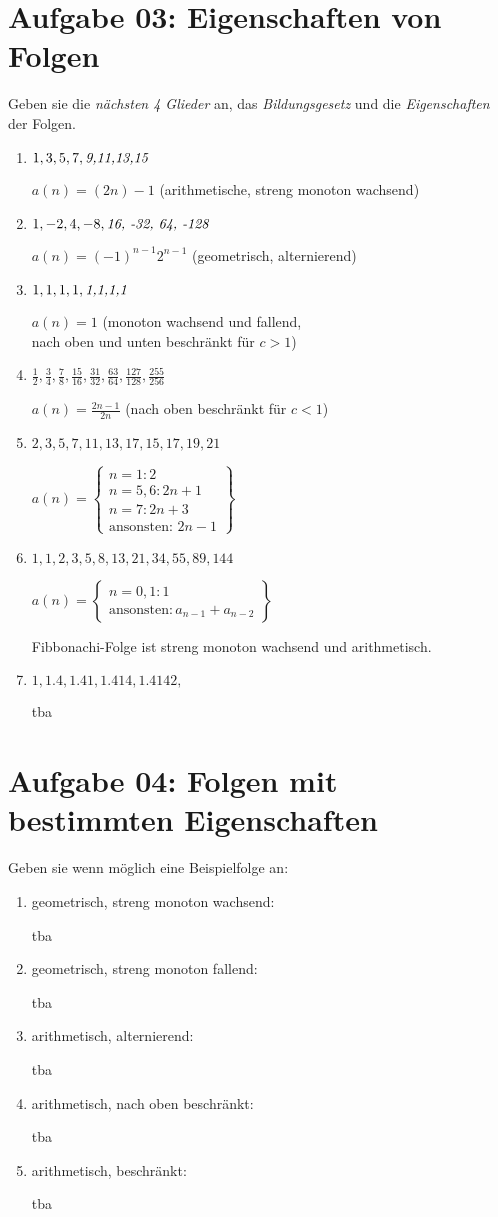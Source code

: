 \documentclass[a4paper,11pt]{article}
\begin{document}
\section{Aufgabe 03: Eigenschaften von Folgen}
Geben sie die \emph{nächsten 4 Glieder} an, das \emph{Bildungsgesetz} und die \emph{Eigenschaften} der Folgen.
\begin{enumerate}[label={\alph*)}]
	\item $1,3,5,7,\emph{9,11,13,15}$

		$a(n)=(2n)-1$ (arithmetische, streng monoton wachsend)
	\item $1,-2,4,-8,\emph{16, -32, 64, -128}$

		$a(n)=(-1)^{n-1}2^{n-1}$ (geometrisch, alternierend)
	\item $1,1,1,1,\emph{1,1,1,1}$

		$a(n)=1$ (monoton wachsend und fallend,\\
		nach oben und unten beschränkt für $c>1$)
	\item $\frac{1}{2},\frac{3}{4},\frac{7}{8},\frac{15}{16},\frac{31}{32},\frac{63}{64},\frac{127}{128},\frac{255}{256}$

		$a(n)=\frac{2n-1}{2n}$ (nach oben beschränkt für $c<1$)
	\item $2,3,5,7,11,13,17,15,17,19,21$

		$a(n)=\begin{Bmatrix}n=1:2\\
			n=5,6: 2n+1\\
			n=7: 2n+3\\
			\text{ansonsten: } 2n-1
		      \end{Bmatrix}$
	\item $1,1,2,3,5,8,13,21,34,55,89,144$

		$a(n)=\begin{Bmatrix}n=0,1: 1\\
			\text{ansonsten}: a_{n-1}+a_{n-2}
		\end{Bmatrix}$

		Fibbonachi-Folge ist streng monoton wachsend und arithmetisch.
	\item $1,1.4,1.41,1.414,1.4142,$

		tba
\end{enumerate}
\section{Aufgabe 04: Folgen mit bestimmten Eigenschaften}
Geben sie wenn möglich eine Beispielfolge an:
\begin{enumerate}[label={\alph*)}]
	\item geometrisch, streng monoton wachsend:

		tba
	\item geometrisch, streng monoton fallend:

		tba
	\item arithmetisch, alternierend:

		tba
	\item arithmetisch, nach oben beschränkt:

		tba
	\item arithmetisch, beschränkt:

		tba
\end{enumerate}
\end{document}

